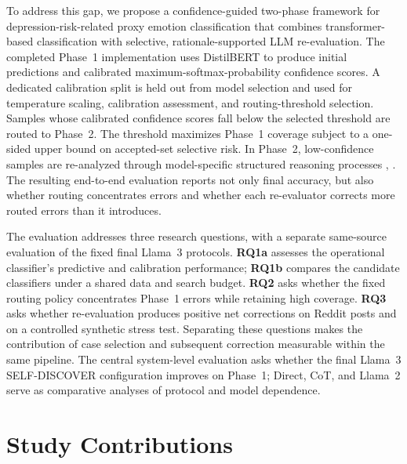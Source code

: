 \documentclass{ieeeaccess}
\begin{document}
To address this gap, we propose a confidence-guided two-phase framework for depression-risk-related proxy emotion classification that combines transformer-based classification with selective, rationale-supported LLM re-evaluation. The completed Phase~1 implementation uses DistilBERT to produce initial predictions and calibrated maximum-softmax-probability confidence scores. A dedicated calibration split is held out from model selection and used for temperature scaling, calibration assessment, and routing-threshold selection. Samples whose calibrated confidence scores fall below the selected threshold are routed to Phase~2. The threshold maximizes Phase~1 coverage subject to a one-sided upper bound on accepted-set selective risk. In Phase~2, low-confidence samples are re-analyzed through model-specific structured reasoning processes \cite{ref17}, \cite{ref18}. The resulting end-to-end evaluation reports not only final accuracy, but also whether routing concentrates errors and whether each re-evaluator corrects more routed errors than it introduces.

The evaluation addresses three research questions, with a separate same-source evaluation of the fixed final Llama~3 protocols. \textbf{RQ1a} assesses the operational classifier's predictive and calibration performance; \textbf{RQ1b} compares the candidate classifiers under a shared data and search budget. \textbf{RQ2} asks whether the fixed routing policy concentrates Phase~1 errors while retaining high coverage. \textbf{RQ3} asks whether re-evaluation produces positive net corrections on Reddit posts and on a controlled synthetic stress test. Separating these questions makes the contribution of case selection and subsequent correction measurable within the same pipeline. The central system-level evaluation asks whether the final Llama~3 SELF-DISCOVER configuration improves on Phase~1; Direct, CoT, and Llama~2 serve as comparative analyses of protocol and model dependence.

\section{Study Contributions}
\end{document}
